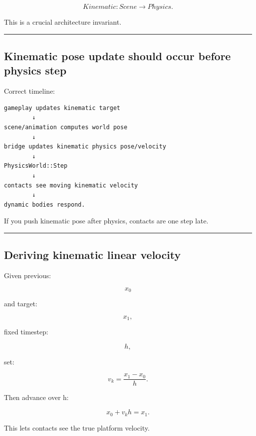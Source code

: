 \[
Kinematic:
Scene\rightarrow Physics.
\]

This is a crucial architecture invariant.

\begin{center}\rule{0.5\linewidth}{0.5pt}\end{center}

\subsection{Kinematic pose update should occur before physics step}\label{06-engine-ii-ch037-kinematic-pose-update-should-occur-before-physics-step}

\hypertarget{06-engine-ii-ch037-kinematic-pose-update-should-occur-before-physics-step}{}

Correct timeline:

\begin{verbatim}
gameplay updates kinematic target
        ↓
scene/animation computes world pose
        ↓
bridge updates kinematic physics pose/velocity
        ↓
PhysicsWorld::Step
        ↓
contacts see moving kinematic velocity
        ↓
dynamic bodies respond.
\end{verbatim}

If you push kinematic pose after physics, contacts are one step late.

\begin{center}\rule{0.5\linewidth}{0.5pt}\end{center}

\subsection{Deriving kinematic linear velocity}\label{06-engine-ii-ch037-deriving-kinematic-linear-velocity}

\hypertarget{06-engine-ii-ch037-deriving-kinematic-linear-velocity}{}

Given previous:

\[
x_0
\]

and target:

\[
x_1,
\]

fixed timestep:

\[
h,
\]

set:

\[
\boxed{
v_k
=
\frac{x_1-x_0}{h}.
}
\]

Then advance over h:

\[
x_0+v_kh=x_1.
\]

This lets contacts see the true platform velocity.

